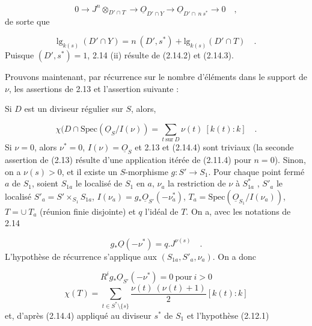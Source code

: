 \begin{equation*}
0 \longrightarrow J^n \otimes_{D'\cap T} \longrightarrow \underline{O}_{D'\cap Y} \longrightarrow \underline{O}_{D'\cap\ n\ s^*} \longrightarrow 0 \quad ,
\end{equation*}
de sorte que 



\begin{equation}\tag{2.14.3}
\mathrm{lg}_{k(s)}\ (D' \cap Y) = n\ (D',s^*) + \mathrm{lg}_{k(s)}(D' \cap T) \quad .
\end{equation}
Puisque $(D',s^*) = 1$, 2.14 (ii) résulte de (2.14.2) et (2.14.3).

Prouvons maintenant, par récurrence sur le nombre d'éléments dans le support de $\nu$, les assertions de 2.13 et l'assertion suivante :

Si $D$ est un diviseur régulier sur $S$, alors,

\begin{equation}\tag{2.14.4}
\chi(D \cap \mathrm{Spec}(\underline{O}_S/I(\nu)) = \sum_{t\ \mathrm{sur}\ D} \nu(t)\ [k(t) : k] \quad .
\end{equation}
Si $\nu = 0$, alors $\nu^* = 0$, $I(\nu) = \underline{O}_S$ et 2.13 et (2.14.4) sont triviaux (la seconde assertion de (2.13) résulte d'une application itérée de (2.11.4) pour $n = 0$). Sinon, on a $\nu(s) > 0$, et il existe un $S$-morphisme $g : S' \longrightarrow S_1$. Pour chaque point fermé $a$ de $S_1$, soient $S_{1a}$ le localisé de $S_1$ en $a$, $\nu_a$ la restriction de $\nu$ à $S_{1a}^*$ , $S'_a$ le localisé $S'_a = S' \times_{S_1} S_{1a}$, $I(\nu_a) = g_* \underline{O}_{S'}(-\nu_a^*)$, $T_a = \mathrm{Spec}(\underline{O}_{S_1}/I(\nu_a))$, $T = \cup\ T_a$ (réunion finie disjointe) et $q$ l'idéal de $T$. On a, avec les notations de 2.14

\begin{equation}\tag{2.14.5}
g_* \underline{O}(-\nu^*) = q.J^{\nu(s)} \quad .
\end{equation}
L'hypothèse de récurrence s'applique aux $(S_{1a}, S'_a, \nu_a)$. On a donc

\begin{equation}\tag{2.14.6}
R^i g_* \underline{O}_{S'}(-\nu^*) = 0 \ \mathrm{pour}\ i > 0
\end{equation}
\begin{equation}\tag{2.14.7}
\chi(T) = \sum_{t \in S^* \setminus \{s\}} \frac{\nu(t)\ (\nu(t)+1)}{2} [k(t) : k]
\end{equation}
et, d'après (2.14.4) appliqué au diviseur $s^*$ de $S_1$ et l'hypothèse (2.12.1)

